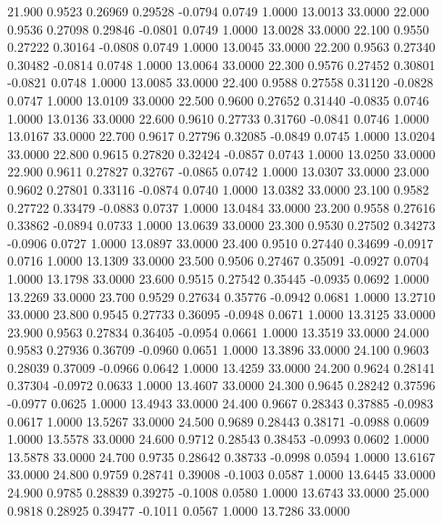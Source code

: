   21.900   0.9523   0.26969   0.29528  -0.0794   0.0749   1.0000  13.0013  33.0000
  22.000   0.9536   0.27098   0.29846  -0.0801   0.0749   1.0000  13.0028  33.0000
  22.100   0.9550   0.27222   0.30164  -0.0808   0.0749   1.0000  13.0045  33.0000
  22.200   0.9563   0.27340   0.30482  -0.0814   0.0748   1.0000  13.0064  33.0000
  22.300   0.9576   0.27452   0.30801  -0.0821   0.0748   1.0000  13.0085  33.0000
  22.400   0.9588   0.27558   0.31120  -0.0828   0.0747   1.0000  13.0109  33.0000
  22.500   0.9600   0.27652   0.31440  -0.0835   0.0746   1.0000  13.0136  33.0000
  22.600   0.9610   0.27733   0.31760  -0.0841   0.0746   1.0000  13.0167  33.0000
  22.700   0.9617   0.27796   0.32085  -0.0849   0.0745   1.0000  13.0204  33.0000
  22.800   0.9615   0.27820   0.32424  -0.0857   0.0743   1.0000  13.0250  33.0000
  22.900   0.9611   0.27827   0.32767  -0.0865   0.0742   1.0000  13.0307  33.0000
  23.000   0.9602   0.27801   0.33116  -0.0874   0.0740   1.0000  13.0382  33.0000
  23.100   0.9582   0.27722   0.33479  -0.0883   0.0737   1.0000  13.0484  33.0000
  23.200   0.9558   0.27616   0.33862  -0.0894   0.0733   1.0000  13.0639  33.0000
  23.300   0.9530   0.27502   0.34273  -0.0906   0.0727   1.0000  13.0897  33.0000
  23.400   0.9510   0.27440   0.34699  -0.0917   0.0716   1.0000  13.1309  33.0000
  23.500   0.9506   0.27467   0.35091  -0.0927   0.0704   1.0000  13.1798  33.0000
  23.600   0.9515   0.27542   0.35445  -0.0935   0.0692   1.0000  13.2269  33.0000
  23.700   0.9529   0.27634   0.35776  -0.0942   0.0681   1.0000  13.2710  33.0000
  23.800   0.9545   0.27733   0.36095  -0.0948   0.0671   1.0000  13.3125  33.0000
  23.900   0.9563   0.27834   0.36405  -0.0954   0.0661   1.0000  13.3519  33.0000
  24.000   0.9583   0.27936   0.36709  -0.0960   0.0651   1.0000  13.3896  33.0000
  24.100   0.9603   0.28039   0.37009  -0.0966   0.0642   1.0000  13.4259  33.0000
  24.200   0.9624   0.28141   0.37304  -0.0972   0.0633   1.0000  13.4607  33.0000
  24.300   0.9645   0.28242   0.37596  -0.0977   0.0625   1.0000  13.4943  33.0000
  24.400   0.9667   0.28343   0.37885  -0.0983   0.0617   1.0000  13.5267  33.0000
  24.500   0.9689   0.28443   0.38171  -0.0988   0.0609   1.0000  13.5578  33.0000
  24.600   0.9712   0.28543   0.38453  -0.0993   0.0602   1.0000  13.5878  33.0000
  24.700   0.9735   0.28642   0.38733  -0.0998   0.0594   1.0000  13.6167  33.0000
  24.800   0.9759   0.28741   0.39008  -0.1003   0.0587   1.0000  13.6445  33.0000
  24.900   0.9785   0.28839   0.39275  -0.1008   0.0580   1.0000  13.6743  33.0000
  25.000   0.9818   0.28925   0.39477  -0.1011   0.0567   1.0000  13.7286  33.0000
